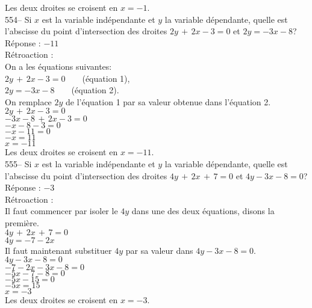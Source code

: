 ﻿\documentclass[letterpaper, 12pt]{article}
\begin{document}
Les deux droites se croisent en $x=-1$.\\

554-- Si $x$ est la variable ind\'ependante et $y$ la variable d\'ependante,
quelle est l'abscisse du point d'intersection des droites $2y\,+\,2x-3=0$ et
$2y=-3x-8$?\\

R\'eponse : $-11$\\

R\'etroaction : \\
On a les \'equations suivantes:\\
$2y\,+\,2x-3=0  \qquad $(\'equation 1),\\
$2y=-3x-8  \qquad $(\'equation 2).\\

On remplace $2y$ de l'\'equation 1 par sa valeur obtenue dans l'\'equation
2.\\
$2y\,+\,2x-3=0$\\
$-3x-8\,+\,2x-3=0$\\
$-x-8-3=0$\\
$-x-11=0$\\
$-x=11$\\
$x=-11$\\
Les deux droites se croisent en $x=-11$.\\

555-- Si $x$ est la variable ind\'ependante et $y$ la variable d\'ependante,
quelle est l'abscisse du point d'intersection des droites
$4y\,+\,2x\,+\,7=0$ et $4y-3x-8=0$?\\

R\'eponse : $-3$\\

R\'etroaction : \\
Il faut commencer par isoler le $4y$ dans une des deux \'equations, disons
la premi\`ere.\\
$4y\,+\,2x\,+\,7=0$\\
$4y=-7-2x$\\

Il faut maintenant substituer $4y$ par sa valeur dans $4y-3x-8=0$.\\
$4y-3x-8=0$\\
$-7-2x-3x-8=0$\\
$-5x-7-8=0$\\
$-5x-15=0$\\
$-5x=15$\\
$x=-3$\\
Les deux droites se croisent en $x=-3$.\\
\end{document}
